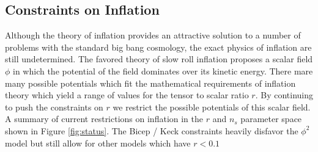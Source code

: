 \documentclass[12pt]{article}
\begin{document}
\subsection{Constraints on Inflation}
Although the theory of inflation provides an attractive solution to a number
of problems with the standard big bang cosmology, the exact physics of
inflation are still undetermined. The favored theory of slow roll inflation
proposes a scalar field $\phi$ in which the potential of the field dominates
over its kinetic energy. There mare many possible potentials which fit the
mathematical requirements of inflation theory which yield a range of values
for the tensor to scalar ratio $r$. By continuing to push the constraints on $r$
we restrict the possible potentials of this scalar field. A summary of current
restrictions on inflation in the $r$ and $n_s$ parameter space
shown in Figure \ref{fig:status}. The Bicep / Keck constraints heavily
disfavor the $\phi ^2$ model but still allow for other models which have
$r<0.1$
\end{document}
